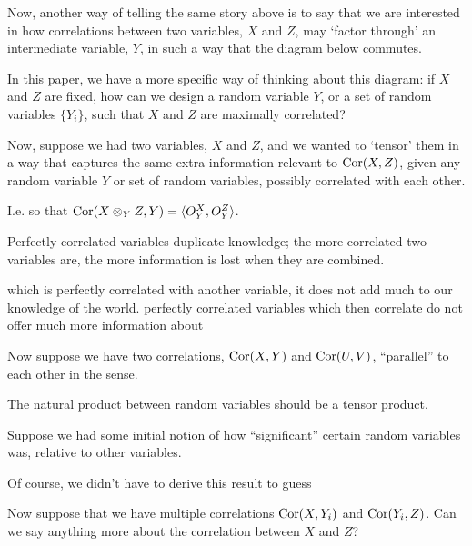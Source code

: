 \documentclass{sig-alternate-05-2015}
\theoremstyle{plain}
\theoremstyle{plain}
\theoremstyle{remark}
\def\Cor{\textnormal{Cor}}
\begin{document}
Now, another way of telling the same story above is to say that we are interested in how correlations between two variables, $X$ and $Z$, may `factor through' an intermediate variable, $Y$, in such a way that the diagram below commutes.
\begin{figure}[h!]
\centering
{}
\end{figure}

In this paper, we have a more specific way of thinking about this diagram: if $X$ and $Z$ are fixed, how can we design a random variable $Y$, or a set of random variables $\{Y_i\}$, such that $X$ and $Z$ are maximally correlated?

Now, suppose we had two variables, $X$ and $Z$, and we wanted to `tensor' them in a way that captures the same extra information relevant to $\Cor(X,Z)$, given any random variable $Y$ or set of random variables, possibly correlated with each other. 

I.e. so that $\Cor(X \otimes_Y Z, Y) = \langle O_Y^X, O_Y^Z \rangle$.

Perfectly-correlated variables duplicate knowledge; the more correlated two variables are, the more information is lost when they are combined.

 which is perfectly correlated with another variable, it does not add much to our knowledge of the world. perfectly correlated variables which then correlate do not offer much more information about 

Now suppose we have two correlations, $\Cor(X,Y)$ and $\Cor(U,V)$, ``parallel'' to each other in the sense.

The natural product between random variables should be a tensor product.

Suppose we had some initial notion of how ``significant'' certain random variables was, relative to other variables.


Of course, we didn't have to derive this result to guess 

Now suppose that we have multiple correlations $\Cor(X,Y_i)$ and $\Cor(Y_i,Z)$. Can we say anything more about the correlation between $X$ and $Z$?
\end{document}
